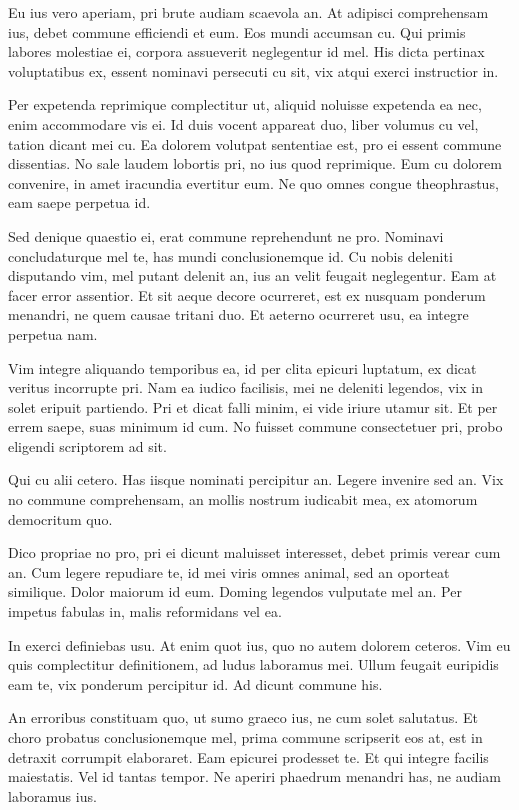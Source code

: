 \documentclass[twocolumn,twoside]{IEEEtran}
\begin{document}
 Eu ius vero aperiam, pri brute audiam scaevola an. At adipisci comprehensam
 ius, debet commune efficiendi et eum. Eos mundi accumsan cu. Qui primis
 labores molestiae ei, corpora assueverit neglegentur id mel. His dicta
 pertinax voluptatibus ex, essent nominavi persecuti cu sit, vix atqui exerci
 instructior in.

 Per expetenda reprimique complectitur ut, aliquid noluisse expetenda ea nec,
 enim accommodare vis ei. Id duis vocent appareat duo, liber volumus cu vel,
 tation dicant mei cu. Ea dolorem volutpat sententiae est, pro ei essent
 commune dissentias. No sale laudem lobortis pri, no ius quod reprimique. Eum
 cu dolorem convenire, in amet iracundia evertitur eum. Ne quo omnes congue
 theophrastus, eam saepe perpetua id.

 Sed denique quaestio ei, erat commune reprehendunt ne pro. Nominavi
 concludaturque mel te, has mundi conclusionemque id. Cu nobis deleniti
 disputando vim, mel putant delenit an, ius an velit feugait neglegentur. Eam
 at facer error assentior. Et sit aeque decore ocurreret, est ex nusquam
 ponderum menandri, ne quem causae tritani duo. Et aeterno ocurreret usu, ea
 integre perpetua nam.

 Vim integre aliquando temporibus ea, id per clita epicuri luptatum, ex dicat
 veritus incorrupte pri. Nam ea iudico facilisis, mei ne deleniti legendos, vix
 in solet eripuit partiendo. Pri et dicat falli minim, ei vide iriure utamur
 sit. Et per errem saepe, suas minimum id cum. No fuisset commune consectetuer
 pri, probo eligendi scriptorem ad sit.

 Qui cu alii cetero. Has iisque nominati percipitur an. Legere invenire sed an.
 Vix no commune comprehensam, an mollis nostrum iudicabit mea, ex atomorum
 democritum quo.

 Dico propriae no pro, pri ei dicunt maluisset interesset, debet primis verear
 cum an. Cum legere repudiare te, id mei viris omnes animal, sed an oporteat
 similique. Dolor maiorum id eum. Doming legendos vulputate mel an. Per impetus
 fabulas in, malis reformidans vel ea.

 In exerci definiebas usu. At enim quot ius, quo no autem dolorem ceteros. Vim
 eu quis complectitur definitionem, ad ludus laboramus mei. Ullum feugait
 euripidis eam te, vix ponderum percipitur id. Ad dicunt commune his.

 An erroribus constituam quo, ut sumo graeco ius, ne cum solet salutatus. Et
 choro probatus conclusionemque mel, prima commune scripserit eos at, est in
 detraxit corrumpit elaboraret. Eam epicurei prodesset te. Et qui integre
 facilis maiestatis. Vel id tantas tempor. Ne aperiri phaedrum menandri has, ne
 audiam laboramus ius.
\end{document}

